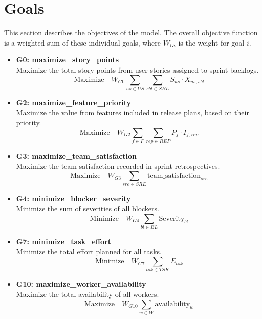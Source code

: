 \documentclass{article}
\begin{document}
\section{Goals}
\label{sec:goals}
This section describes the objectives of the model. The overall objective function is a weighted sum of these individual goals, where $W_{Gi}$ is the weight for goal $i$.
\begin{itemize}
    \item \textbf{G0: maximize\_story\_points}\\
    Maximize the total story points from user stories assigned to sprint backlogs.
    $$ \text{Maximize} \quad W_{G0} \sum_{us \in US} \sum_{sbl \in SBL} S_{us} \cdot X_{us, sbl} $$
    
    \item \textbf{G2: maximize\_feature\_priority}\\
    Maximize the value from features included in release plans, based on their priority.
    $$ \text{Maximize} \quad W_{G2} \sum_{f \in F} \sum_{rep \in REP} P_f \cdot I_{f, rep} $$

    \item \textbf{G3: maximize\_team\_satisfaction}\\
    Maximize the team satisfaction recorded in sprint retrospectives.
    $$ \text{Maximize} \quad W_{G3} \sum_{sre \in SRE} \text{team\_satisfaction}_{sre} $$

    \item \textbf{G4: minimize\_blocker\_severity}\\
    Minimize the sum of severities of all blockers.
    $$ \text{Minimize} \quad W_{G4} \sum_{bl \in BL} \text{Severity}_{bl} $$
    
    \item \textbf{G7: minimize\_task\_effort}\\
    Minimize the total effort planned for all tasks.
    $$ \text{Minimize} \quad W_{G7} \sum_{tsk \in TSK} E_{tsk} $$

    \item \textbf{G10: maximize\_worker\_availability}\\
    Maximize the total availability of all workers.
    $$ \text{Maximize} \quad W_{G10} \sum_{w \in W} \text{availability}_w $$
\end{itemize}

\end{document}
